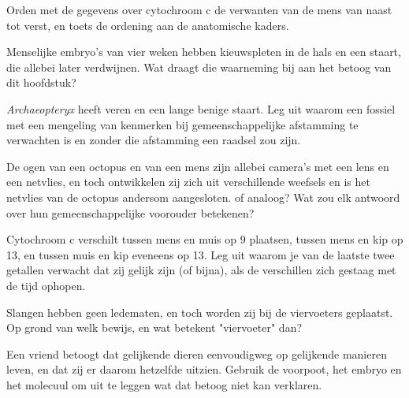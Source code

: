 \begin{exercise}[$\star\star$]\label{exo:g10:common-ancestry:9}
Orden met de gegevens over cytochroom c de verwanten van de mens van
naast tot verst, en toets de ordening aan de anatomische kaders.
\end{exercise}

\begin{exercise}[$\star\star$]\label{exo:g10:common-ancestry:10}
Menselijke embryo's van vier weken hebben kieuwspleten in de hals en een
staart, die allebei later verdwijnen. Wat draagt die waarneming bij aan
het betoog van dit hoofdstuk?
\end{exercise}

\begin{exercise}[$\star\star$]\label{exo:g10:common-ancestry:11}
\emph{Archaeopteryx} heeft veren en een lange benige staart. Leg uit
waarom een fossiel met een mengeling van kenmerken bij gemeenschappelijke
afstamming te verwachten is en zonder die afstamming een raadsel zou
zijn.
\end{exercise}

\begin{exercise}[$\star\star\star$]\label{exo:g10:common-ancestry:12}
De ogen van een octopus en van een mens zijn allebei camera's met een
lens en een netvlies, en toch ontwikkelen zij zich uit verschillende
weefsels en is het netvlies van de octopus andersom aangesloten.
 of analoog? Wat zou elk antwoord over hun gemeenschappelijke
voorouder betekenen?
\end{exercise}

\begin{exercise}[$\star\star\star$]\label{exo:g10:common-ancestry:13}
Cytochroom c verschilt tussen mens en muis op 9 plaatsen, tussen mens en
kip op 13, en tussen muis en kip eveneens op 13. Leg uit waarom je van
de laatste twee getallen verwacht dat zij gelijk zijn (of bijna), als de
verschillen zich gestaag met de tijd ophopen.
\end{exercise}

\begin{exercise}[$\star\star\star$]\label{exo:g10:common-ancestry:14}
Slangen hebben geen ledematen, en toch worden zij bij de viervoeters
geplaatst. Op grond van welk bewijs, en wat betekent "viervoeter" dan?
\end{exercise}

\begin{exercise}[$\star\star\star$]\label{exo:g10:common-ancestry:15}
Een vriend betoogt dat gelijkende dieren eenvoudigweg op gelijkende
manieren leven, en dat zij er daarom hetzelfde uitzien. Gebruik de
voorpoot, het embryo en het molecuul om uit te leggen wat dat betoog
niet kan verklaren.
\end{exercise}

